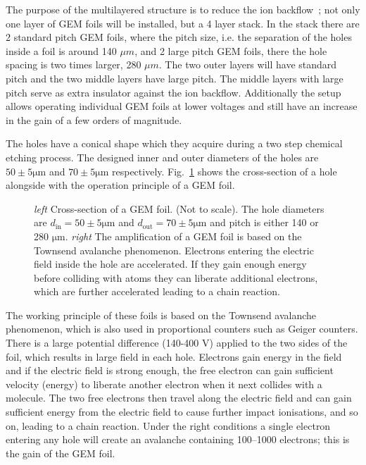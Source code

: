 The purpose of the multilayered structure is to reduce the ion backflow~\cite{missing}; not only one layer of GEM foils will be installed, but a 4 layer stack. In the stack there are 2 standard pitch GEM foils, where the pitch size, i.e. the separation of the holes inside a foil is around 140 $\mu m$, and 2 large pitch GEM foils, there the hole spacing is two times larger, 280 $\mu m$. The two outer layers will have standard pitch and the two middle layers have large pitch. The middle layers with large pitch serve as extra insulator against the ion backflow. Additionally the setup allows operating individual GEM foils at lower voltages and still have an increase in the gain of a few orders of magnitude. ~\cite{TPCupgrade}

The holes have a conical shape which they acquire during a two step chemical etching process. The designed inner and outer diameters of the holes are $50\pm5 \mathrm{\mu m}$ and $70 \pm 5 \mathrm{\mu m}$ respectively. Fig.~\ref{fig:gem} shows the cross-section of a hole alongside with the operation principle of a GEM foil.

\begin{figure}[htb]
\centering

\caption{{\it left} Cross-section of a GEM foil. (Not to scale). The hole diameters are $d_\mathrm{in} = 50\pm5 \mathrm{\mu m}$ and $d_\mathrm{out} =70 \pm 5 \mathrm{\mu m}$ and pitch is either 140 or 280 $\mathrm{\mu m}$. {\it right} The amplification of a GEM foil is based on the Townsend avalanche phenomenon. Electrons entering the electric field inside the hole are accelerated. If they gain enough energy before colliding with atoms they can liberate additional electrons, which are further accelerated leading to a chain reaction.}
\label{fig:gem}
\end{figure}

The working principle of these foils is based on the Townsend avalanche phenomenon, which is also used in proportional counters such as Geiger counters. There is a large potential difference (140-400 V) applied to the two sides of the foil, which results in large field in each hole. Electrons gain energy in the field and if the electric field is strong enough, the free electron can gain sufficient velocity (energy) to liberate another electron when it next collides with a molecule. The two free electrons then travel along the electric field and can gain sufficient energy from the electric field to cause further impact ionisations, and so on, leading to a chain reaction. Under the right conditions a single electron entering any hole will create an avalanche containing 100–1000 electrons; this is the gain of the GEM foil. 

